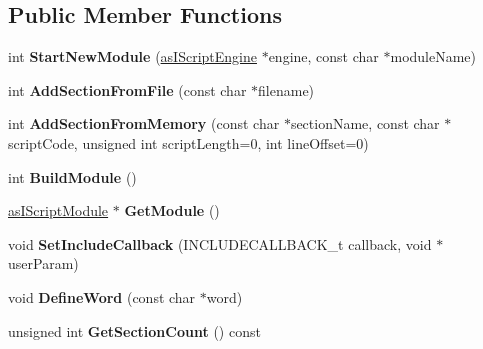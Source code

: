 \subsection*{Public Member Functions}
\begin{DoxyCompactItemize}
\item 
\mbox{\label{class_c_script_builder_a84e7c2825e0e53b10d758878a3f833c7}} 
int {\bfseries Start\+New\+Module} (\hyperlink{classas_i_script_engine}{as\+I\+Script\+Engine} $\ast$engine, const char $\ast$module\+Name)
\item 
\mbox{\label{class_c_script_builder_a0907f970813155f58dec78f4de43ff0e}} 
int {\bfseries Add\+Section\+From\+File} (const char $\ast$filename)
\item 
\mbox{\label{class_c_script_builder_ad7a4e8117dfb095317f386dca05b8f11}} 
int {\bfseries Add\+Section\+From\+Memory} (const char $\ast$section\+Name, const char $\ast$script\+Code, unsigned int script\+Length=0, int line\+Offset=0)
\item 
\mbox{\label{class_c_script_builder_ae075d9180af198ef0c7a42f1d4297b87}} 
int {\bfseries Build\+Module} ()
\item 
\mbox{\label{class_c_script_builder_a682f074f5195324b58a418b1a943bb40}} 
\hyperlink{classas_i_script_module}{as\+I\+Script\+Module} $\ast$ {\bfseries Get\+Module} ()
\item 
\mbox{\label{class_c_script_builder_a9fffee23786ec3e1c1edc038bb3a6d7e}} 
void {\bfseries Set\+Include\+Callback} (I\+N\+C\+L\+U\+D\+E\+C\+A\+L\+L\+B\+A\+C\+K\+\_\+t callback, void $\ast$user\+Param)
\item 
\mbox{\label{class_c_script_builder_ab2d9ea83814daecc6705495588814c6c}} 
void {\bfseries Define\+Word} (const char $\ast$word)
\item 
\mbox{\label{class_c_script_builder_a37d580643da4fcc4fa5f15788968149b}} 
unsigned int {\bfseries Get\+Section\+Count} () const
\item 
\mbox{\label{class_c_script_builder_a41fa3bfd0923ae6129588d4e9a3a52e8}} 

\end{DoxyCompactItemize}
